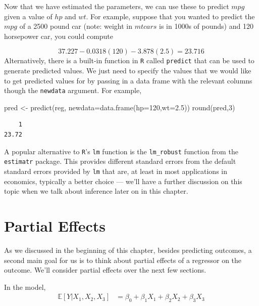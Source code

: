 \documentclass[
  letterpaper,
  DIV=11,
  numbers=noendperiod]{scrreprt}
\newenvironment{Shaded}{\begin{snugshade}}{\end{snugshade}}
\newcommand{\AttributeTok}[1]{\textcolor[rgb]{0.40,0.45,0.13}{#1}}
\newcommand{\DecValTok}[1]{\textcolor[rgb]{0.68,0.00,0.00}{#1}}
\newcommand{\FloatTok}[1]{\textcolor[rgb]{0.68,0.00,0.00}{#1}}
\newcommand{\FunctionTok}[1]{\textcolor[rgb]{0.28,0.35,0.67}{#1}}
\newcommand{\NormalTok}[1]{\textcolor[rgb]{0.00,0.23,0.31}{#1}}
\newcommand{\OtherTok}[1]{\textcolor[rgb]{0.00,0.23,0.31}{#1}}
\begin{document}
Now that we have estimated the parameters, we can use these to predict
\(mpg\) given a value of \(hp\) and \(wt\). For example, suppose that
you wanted to predict the \(mpg\) of a 2500 pound car (note: weight in
\(mtcars\) is in 1000s of pounds) and 120 horsepower car, you could
compute

\[
  37.227 - 0.0318(120) - 3.878(2.5) = 23.716
\] Alternatively, there is a built-in function in \texttt{R} called
\texttt{predict} that can be used to generate predicted values. We just
need to specify the values that we would like to get predicted values
for by passing in a data frame with the relevant columns though the
\texttt{newdata} argument. For example,

\begin{Shaded}
\begin{Highlighting}[]
\NormalTok{pred }\OtherTok{\textless{}{-}} \FunctionTok{predict}\NormalTok{(reg, }\AttributeTok{newdata=}\FunctionTok{data.frame}\NormalTok{(}\AttributeTok{hp=}\DecValTok{120}\NormalTok{,}\AttributeTok{wt=}\FloatTok{2.5}\NormalTok{))}
\FunctionTok{round}\NormalTok{(pred,}\DecValTok{3}\NormalTok{)}
\end{Highlighting}
\end{Shaded}

\begin{verbatim}
    1 
23.72 
\end{verbatim}

A popular alternative to \texttt{R}'s \texttt{lm} function is the
\texttt{lm\_robust} function from the \texttt{estimatr} package. This
provides different standard errors from the default standard errors
provided by \texttt{lm} that are, at least in most applications in
economics, typically a better choice --- we'll have a further discussion
on this topic when we talk about inference later on in this chapter.

\section{Partial Effects}\label{partial-effects}

As we discussed in the beginning of this chapter, besides predicting
outcomes, a second main goal for us is to think about partial effects of
a regressor on the outcome. We'll consider partial effects over the next
few sections.

In the model, \begin{align*}
  \mathbb{E}[Y | X_1, X_2, X_3]  &= \beta_0 + \beta_1 X_1 + \beta_2 X_2 + \beta_3 X_3
\end{align*}
\end{document}
